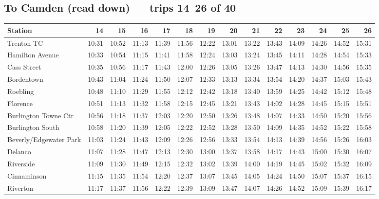 \subsection*{To Camden (read down) --- trips 14--26 of 40}
\begin{center}\footnotesize\setlength{\tabcolsep}{3pt}\begin{tabular}{@{}lrrrrrrrrrrrrr@{}}\toprule
Station & 14 & 15 & 16 & 17 & 18 & 19 & 20 & 21 & 22 & 23 & 24 & 25 & 26 \\\midrule
Trenton TC & 10:31 & 10:52 & 11:13 & 11:39 & 11:56 & 12:22 & 13:01 & 13:22 & 13:43 & 14:09 & 14:26 & 14:52 & 15:31 \\
Hamilton Avenue & 10:33 & 10:54 & 11:15 & 11:41 & 11:58 & 12:24 & 13:03 & 13:24 & 13:45 & 14:11 & 14:28 & 14:54 & 15:33 \\
Cass Street & 10:35 & 10:56 & 11:17 & 11:43 & 12:00 & 12:26 & 13:05 & 13:26 & 13:47 & 14:13 & 14:30 & 14:56 & 15:35 \\
Bordentown & 10:43 & 11:04 & 11:24 & 11:50 & 12:07 & 12:33 & 13:13 & 13:34 & 13:54 & 14:20 & 14:37 & 15:03 & 15:43 \\
Roebling & 10:48 & 11:10 & 11:29 & 11:55 & 12:12 & 12:42 & 13:18 & 13:40 & 13:59 & 14:25 & 14:42 & 15:12 & 15:48 \\
Florence & 10:51 & 11:13 & 11:32 & 11:58 & 12:15 & 12:45 & 13:21 & 13:43 & 14:02 & 14:28 & 14:45 & 15:15 & 15:51 \\
Burlington Towne Ctr & 10:56 & 11:18 & 11:37 & 12:03 & 12:20 & 12:50 & 13:26 & 13:48 & 14:07 & 14:33 & 14:50 & 15:20 & 15:56 \\
Burlington South & 10:58 & 11:20 & 11:39 & 12:05 & 12:22 & 12:52 & 13:28 & 13:50 & 14:09 & 14:35 & 14:52 & 15:22 & 15:58 \\
Beverly/Edgewater Park & 11:03 & 11:24 & 11:43 & 12:09 & 12:26 & 12:56 & 13:33 & 13:54 & 14:13 & 14:39 & 14:56 & 15:26 & 16:03 \\
Delanco & 11:07 & 11:28 & 11:47 & 12:13 & 12:30 & 13:00 & 13:37 & 13:58 & 14:17 & 14:43 & 15:00 & 15:30 & 16:07 \\
Riverside & 11:09 & 11:30 & 11:49 & 12:15 & 12:32 & 13:02 & 13:39 & 14:00 & 14:19 & 14:45 & 15:02 & 15:32 & 16:09 \\
Cinnaminson & 11:15 & 11:35 & 11:54 & 12:20 & 12:37 & 13:07 & 13:45 & 14:05 & 14:24 & 14:50 & 15:07 & 15:37 & 16:15 \\
Riverton & 11:17 & 11:37 & 11:56 & 12:22 & 12:39 & 13:09 & 13:47 & 14:07 & 14:26 & 14:52 & 15:09 & 15:39 & 16:17 \\

\end{tabular}
\end{center}
